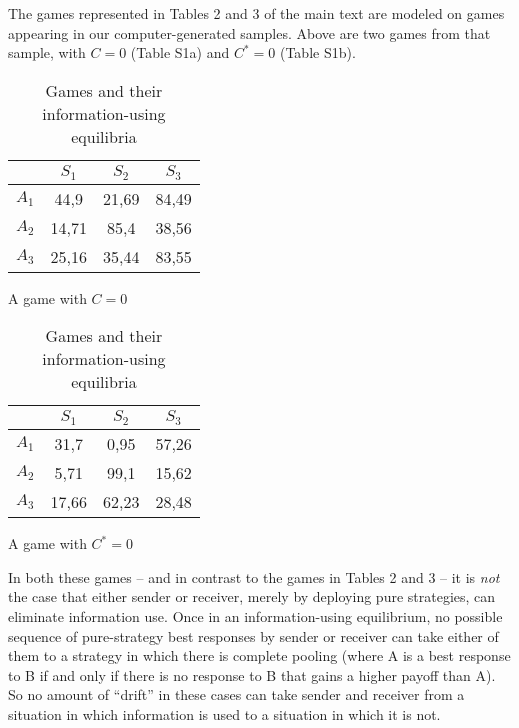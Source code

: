 \documentclass{article}
\begin{document}
The games represented in Tables 2 and 3 of the main text are modeled on
games appearing in our computer-generated samples. Above are two
games from that sample, with $C=0$ (Table S1a) and $C^*=0$ (Table S1b).

\begin{table}
    \centering
    \begin{subtable}{.4\textwidth}
        \begin{tabular}{|c||c|c|c|}
        & $S_{1}$ & $S_{2}$ & $S_{3}$ \\
        \hline
        $A_{1}$ & 44,9 & 21,69 & 84,49 \\
        $A_{2}$ & 14,71 & 85,4 & 38,56 \\
        $A_{3}$ & 25,16 & 35,44 & 83,55 \\
        \end{tabular}
        \newline
        \newline
        \caption{A game with $C=0$}
    \end{subtable}
    \begin{subtable}{.4\textwidth}
        \begin{tabular}{|c||c|c|c|}
        & $S_{1}$ & $S_{2}$ & $S_{3}$ \\
        \hline
        $A_{1}$ & 31,7 & 0,95 & 57,26 \\
        $A_{2}$ & 5,71 & 99,1 & 15,62 \\
        $A_{3}$ & 17,66 & 62,23 & 28,48 \\
        \end{tabular}
        \newline
        \newline
        \caption{A game with $C^*=0$}
    \end{subtable}
    \caption{Games and their information-using equilibria}
    \label{tab:label}
\end{table}

In both these games -- and in contrast to the games in Tables 2 and 3 -- it
is \emph{not} the case that either sender or receiver, merely by deploying
pure strategies, can eliminate information use.  Once in an information-using equilibrium, no possible sequence of pure-strategy best responses by sender or receiver can take either of them to a strategy in which there is complete pooling (where A is a best response to B if and only if there is no response to B that gains a higher payoff than A). So no amount of ``drift'' in these cases can take sender and receiver from a situation in which information is used to a situation in which it is not.
\end{document}
